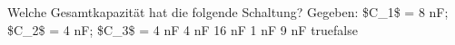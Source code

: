     {Welche Gesamtkapazität hat die folgende Schaltung? Gegeben: \$C\_1\$ = 8 nF; \$C\_2\$ = 4 nF; \$C\_3\$ = 4 nF}
    {4 nF}
    {16 nF}
    {1 nF}
    {9 nF}
    {true}{false}